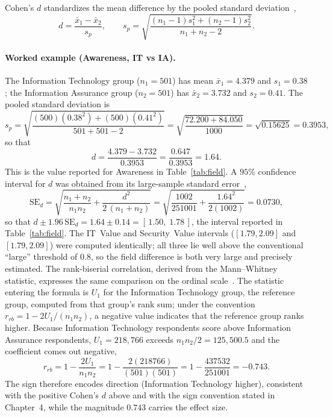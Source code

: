 Cohen's $d$ standardizes the mean difference by the pooled standard deviation~\parencite{Cohen_1988},
\begin{equation}
  d = \frac{\bar{x}_1-\bar{x}_2}{s_p},
  \qquad
  s_p = \sqrt{\frac{(n_1-1)s_1^2+(n_2-1)s_2^2}{n_1+n_2-2}}.
\end{equation}

\paragraph{Worked example (Awareness, IT vs IA).} The Information Technology group ($n_1=501$) has mean $\bar{x}_1=4.379$ and $s_1=0.38$; the Information Assurance group ($n_2=501$) has $\bar{x}_2=3.732$ and $s_2=0.41$. The pooled standard deviation is
\begin{equation}
  s_p = \sqrt{\frac{(500)(0.38^2)+(500)(0.41^2)}{501+501-2}}
      = \sqrt{\frac{72.200+84.050}{1000}} = \sqrt{0.15625} = 0.3953,
\end{equation}
so that
\begin{equation}
  d = \frac{4.379-3.732}{0.3953} = \frac{0.647}{0.3953} = 1.64 .
\end{equation}
This is the value reported for Awareness in Table~\ref{tab:field}. A $95\%$ confidence interval for $d$ was obtained from its large-sample standard error~\parencite{Hedges_Olkin_1985},
\begin{equation}
  \mathrm{SE}_d = \sqrt{\frac{n_1+n_2}{n_1 n_2}+\frac{d^2}{2\,(n_1+n_2)}}
              = \sqrt{\frac{1002}{251001}+\frac{1.64^2}{2(1002)}} = 0.0730,
\end{equation}
so that $d \pm 1.96\,\mathrm{SE}_d = 1.64 \pm 0.14 = [\,1.50,\;1.78\,]$, the interval reported in Table~\ref{tab:field}. The IT~Value and Security~Value intervals ($[1.79,2.09]$ and $[1.79,2.09]$) were computed identically; all three lie well above the conventional ``large'' threshold of $0.8$, so the field difference is both very large and precisely estimated. The rank-biserial correlation, derived from the Mann--Whitney statistic, expresses the same comparison on the ordinal scale~\parencite{Kerby_2014}. The statistic entering the formula is $U_1$ for the Information Technology group, the reference group, computed from that group's rank sum; under the convention $r_{rb}=1-2U_1/(n_1 n_2)$, a negative value indicates that the reference group ranks higher. Because Information Technology respondents score above Information Assurance respondents, $U_1 = 218{,}766$ exceeds $n_1 n_2/2 = 125{,}500.5$ and the coefficient comes out negative,
\begin{equation}
  r_{rb} = 1-\frac{2U_1}{n_1 n_2}
         = 1-\frac{2(218766)}{(501)(501)}
         = 1-\frac{437532}{251001} = -0.743 .
\end{equation}
The sign therefore encodes direction (Information Technology higher), consistent with the positive Cohen's $d$ above and with the sign convention stated in Chapter~4, while the magnitude $0.743$ carries the effect size.

